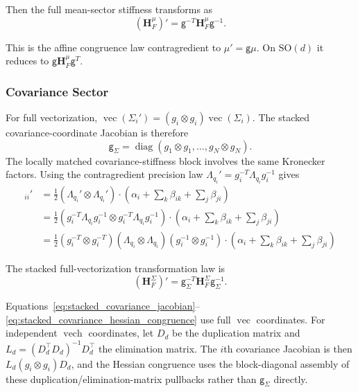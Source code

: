 \documentclass[12pt]{article}
\begin{document}
Then the full mean-sector stiffness transforms as
\begin{equation}
\boxed{(\mathbf H_F^\mu)' = \mathsf g^{-T}\mathbf H_F^\mu\mathsf g^{-1}}.
\end{equation}

This is the affine congruence law contragredient to $\mu'=\mathsf g\mu$. On $\mathrm{SO}(d)$ it reduces to $\mathsf g\mathbf H_F^\mu\mathsf g^T$.

\subsubsection{Covariance Sector}

For full vectorization, $\operatorname{vec}(\Sigma_i')=(g_i\otimes g_i)\operatorname{vec}(\Sigma_i)$. The stacked covariance-coordinate Jacobian is therefore
\begin{equation}
\mathsf g_\Sigma
=\operatorname{diag}(g_1\otimes g_1,\ldots,g_N\otimes g_N).
\label{eq:stacked_covariance_jacobian}
\end{equation}
The locally matched covariance-stiffness block involves the same Kronecker factors. Using the contragredient precision law $\Lambda_{q_i}'=g_i^{-T}\Lambda_{q_i}g_i^{-1}$ gives
\begin{align}
[\mathbf H_F^\Sigma]_{ii}' &= \frac{1}{2}(\Lambda_{q_i}' \otimes \Lambda_{q_i}') \cdot \left(\alpha_i + \sum_k \beta_{ik} + \sum_j \beta_{ji}\right) \nonumber\\
&= \frac{1}{2}(g_i^{-T}\Lambda_{q_i} g_i^{-1} \otimes g_i^{-T}\Lambda_{q_i} g_i^{-1}) \cdot \left(\alpha_i + \sum_k \beta_{ik} + \sum_j \beta_{ji}\right) \nonumber\\
&= \frac{1}{2}(g_i^{-T} \otimes g_i^{-T})(\Lambda_{q_i} \otimes \Lambda_{q_i})(g_i^{-1} \otimes g_i^{-1}) \cdot \left(\alpha_i + \sum_k \beta_{ik} + \sum_j \beta_{ji}\right)
\end{align}

The stacked full-vectorization transformation law is
\begin{equation}
\boxed{(\mathbf H_F^\Sigma)'=\mathsf g_\Sigma^{-T}\mathbf H_F^\Sigma\mathsf g_\Sigma^{-1}.}
\label{eq:stacked_covariance_hessian_congruence}
\end{equation}

Equations~\eqref{eq:stacked_covariance_jacobian}--\eqref{eq:stacked_covariance_hessian_congruence} use full $\operatorname{vec}$ coordinates. For independent $\operatorname{vech}$ coordinates, let $D_d$ be the duplication matrix and $L_d=(D_d^\top D_d)^{-1}D_d^\top$ the elimination matrix. The $i$th covariance Jacobian is then $L_d(g_i\otimes g_i)D_d$, and the Hessian congruence uses the block-diagonal assembly of these duplication/elimination-matrix pullbacks rather than $\mathsf g_\Sigma$ directly.
\end{document}
